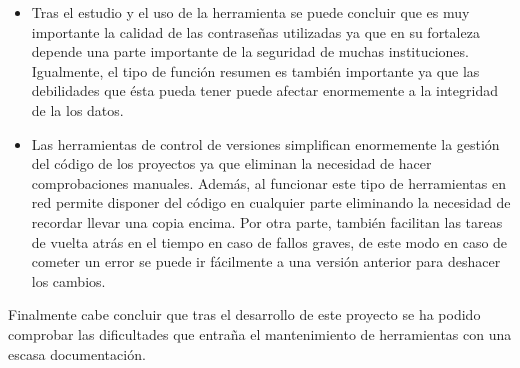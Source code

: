 \begin{itemize}
	\item Tras el estudio y el uso de la herramienta se puede concluir que es muy importante la calidad de las contraseñas utilizadas ya que en su fortaleza depende una parte importante de la seguridad de muchas instituciones. Igualmente, el tipo de función resumen es también importante ya que las debilidades que ésta pueda tener puede afectar enormemente a la integridad de la los datos.
		
	\item Las herramientas de control de versiones simplifican enormemente la gestión del código de los proyectos ya que eliminan la necesidad de hacer comprobaciones manuales. Además, al funcionar este tipo de herramientas en red permite disponer del código en cualquier parte eliminando la necesidad de recordar llevar una copia encima. Por otra parte, también facilitan las tareas de vuelta atrás en el tiempo en caso de fallos graves, de este modo en caso de cometer un error se puede ir fácilmente a una versión anterior para deshacer los cambios.
\end{itemize}

Finalmente cabe concluir que tras el desarrollo de este proyecto se ha podido comprobar las dificultades que entraña el mantenimiento de herramientas con una escasa documentación.